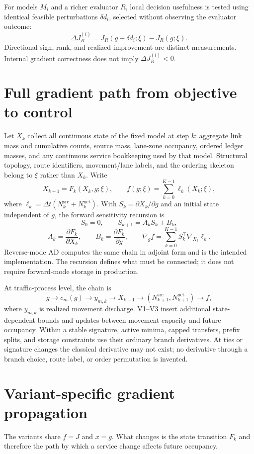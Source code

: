 \documentclass[10pt]{article}
\begin{document}
For models $M_i$ and a richer evaluator $R$, local decision usefulness is tested using identical feasible perturbations $\delta d_i$, selected without observing the evaluator outcome:
\[
  \Delta J_R^{(i)} = J_R(g+\delta d_i;\xi)-J_R(g;\xi).
\]
Directional sign, rank, and realized improvement are distinct measurements. Internal gradient correctness does not imply $\Delta J_R^{(i)}<0$.

\section{Full gradient path from objective to control}
Let $X_k$ collect all continuous state of the fixed model at step $k$: aggregate link mass and cumulative counts, source mass, lane-zone occupancy, ordered ledger masses, and any continuous service bookkeeping used by that model. Structural topology, route identifiers, movement/lane labels, and the ordering skeleton belong to $\xi$ rather than $X_k$. Write
\[
   X_{k+1} = F_k(X_k,g;\xi),
   \qquad
   f(g;\xi)=\sum_{k=0}^{K-1}\ell_k(X_k;\xi),
\]
where $\ell_k=\Delta t(N_k^{\mathrm{src}}+N_k^{\mathrm{net}})$. With $S_k=\partial X_k/\partial g$ and an initial state independent of $g$, the forward sensitivity recursion is
\[
   S_0=0,\qquad
   S_{k+1}=A_kS_k+B_k,
\]
\[
   A_k=\frac{\partial F_k}{\partial X_k},
   \qquad
   B_k=\frac{\partial F_k}{\partial g},
   \qquad
   \nabla_g f=\sum_{k=0}^{K-1}S_k^\top\nabla_{X_k}\ell_k.
\]
Reverse-mode AD computes the same chain in adjoint form and is the intended implementation. The recursion defines what must be connected; it does not require forward-mode storage in production.

At traffic-process level, the chain is
\[
g \longrightarrow c_m(g) \longrightarrow y_{m,k}
\longrightarrow X_{k+1}
\longrightarrow (N_{k+1}^{\mathrm{src}},N_{k+1}^{\mathrm{net}})
\longrightarrow f,
\]
where $y_{m,k}$ is realized movement discharge. V1--V3 insert additional state-dependent bounds and updates between movement capacity and future occupancy. Within a stable signature, active minima, capped transfers, prefix splits, and storage constraints use their ordinary branch derivatives. At ties or signature changes the classical derivative may not exist; no derivative through a branch choice, route label, or order permutation is invented.

\section{Variant-specific gradient propagation}
The variants share $f=J$ and $x=g$. What changes is the state transition $F_k$ and therefore the path by which a service change affects future occupancy.
\end{document}
